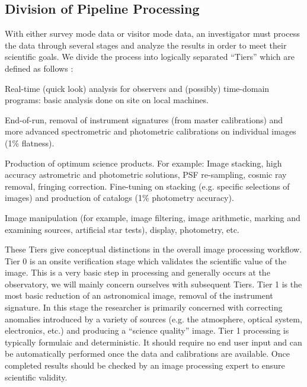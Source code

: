 \documentclass[10pt,conference]{IEEEtran}
\begin{document}
\subsection{Division of Pipeline Processing}\label{sec:tiers}

With either survey mode data or visitor mode data, an investigator must process the data through several stages and analyze the results in order to meet their scientific goals. We divide the process into logically separated ``Tiers'' which are defined as follows \cite{PASRD}:
\begin{description} 
\item[\bf Tier 0] Real-time (quick look) analysis for observers and (possibly) time-domain
programs: basic analysis done on site on local machines. 
\item[\bf Tier 1] End-of-run, removal of instrument signatures (from master calibrations) and more
advanced spectrometric and photometric calibrations on individual images (1\% flatness).
\item[\bf Tier 2] Production of optimum science products. For example: Image stacking, high
accuracy astrometric and photometric solutions, PSF re-sampling, cosmic ray removal,
fringing correction. Fine-tuning on stacking (e.g. specific selections of images) and
production of catalogs (1\% photometry accuracy).
\item[\bf Tier 3] Image manipulation (for example, image filtering, image arithmetic, marking and
examining sources, artificial star tests), display, photometry, etc.
\end{description}

These Tiers give conceptual distinctions in the overall image processing workflow. Tier 0 is an onsite verification stage which validates the scientific value of the image. This is a very basic step in processing and generally occurs at the observatory, we will mainly concern ourselves with subsequent Tiers. Tier 1 is the most basic reduction of an astronomical image, removal of the instrument signature. In this stage the researcher is primarily concerned with correcting anomalies introduced by a variety of sources (e.g. the atmosphere, optical system, electronics, etc.) and producing a ``science quality'' image. Tier 1 processing is typically formulaic and deterministic. It should require no end user input and can be automatically performed once the data and calibrations are available. Once completed results should be checked by an image processing expert to ensure scientific validity.
\end{document}
